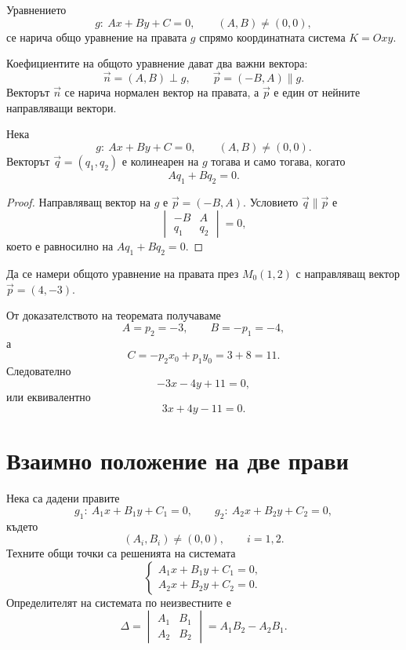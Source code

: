 \begin{defn}
Уравнението
\[
 g:\ Ax+By+C=0,\qquad (A,B)\neq(0,0),
\]
се нарича общо уравнение на правата $g$ спрямо координатната система
$K=Oxy$.
\end{defn}

Коефициентите на общото уравнение дават два важни вектора:
\[
 \vec n=(A,B)\perp g,\qquad
 \vec p=(-B,A)\parallel g.
\]
Векторът $\vec n$ се нарича нормален вектор на правата, а
$\vec p$ е един от нейните направляващи вектори.

\begin{prop}
Нека
\[
 g:\ Ax+By+C=0,\qquad (A,B)\neq(0,0).
\]
Векторът $\vec q=(q_1,q_2)$ е колинеарен на $g$ тогава и само тогава,
когато
\[
 Aq_1+Bq_2=0.
\]
\end{prop}

\begin{proof}
Направляващ вектор на $g$ е $\vec p=(-B,A)$. Условието
$\vec q\parallel\vec p$ е
\[
 \begin{vmatrix}
 -B & A\\
 q_1 & q_2
 \end{vmatrix}=0,
\]
което е равносилно на $Aq_1+Bq_2=0$.
\end{proof}

\begin{example}
Да се намери общото уравнение на правата през $M_0(1,2)$ с
направляващ вектор $\vec p=(4,-3)$.

От доказателството на теоремата получаваме
\[
 A=p_2=-3,\qquad B=-p_1=-4,
\]
а
\[
 C=-p_2x_0+p_1y_0=3+8=11.
\]
Следователно
\[
 -3x-4y+11=0,
\]
или еквивалентно
\[
 3x+4y-11=0.
\]
\end{example}

\section{Взаимно положение на две прави}\label{s:28.3}

Нека са дадени правите
\[
 g_1:\ A_1x+B_1y+C_1=0,\qquad
 g_2:\ A_2x+B_2y+C_2=0,
\]
където
\[
 (A_i,B_i)\neq(0,0),\qquad i=1,2.
\]
Техните общи точки са решенията на системата
\[
 \begin{cases}
 A_1x+B_1y+C_1=0,\\
 A_2x+B_2y+C_2=0.
 \end{cases}
\]
Определителят на системата по неизвестните е
\[
 \Delta=
 \begin{vmatrix}
 A_1&B_1\\
 A_2&B_2
 \end{vmatrix}
 =A_1B_2-A_2B_1.
\]

